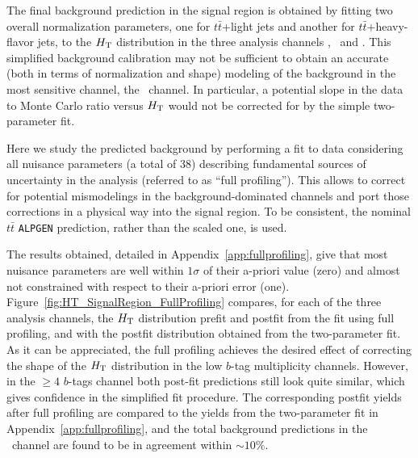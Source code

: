 
The final background 
prediction in the signal region is obtained by fitting two overall
normalization parameters, one for $t\bar{t}$+light jets 
and another for $t\bar{t}$+heavy-flavor jets, to the $\HT$ distribution in the
three analysis channels \chii, \chiii\ and \chiv. 
This simplified background 
calibration may not be sufficient to obtain an accurate 
(both in terms of normalization and shape) 
modeling of the background in the most sensitive channel, the
\chiv\ channel.
In particular, a potential slope in the data to Monte Carlo 
ratio versus $\HT$ would not be corrected for by the 
simple two-parameter fit.

Here we study the predicted background by performing 
a fit to data considering all nuisance parameters 
(a total of 38) describing fundamental
sources of uncertainty in the analysis (referred to as 
``full profiling''). This allows 
to correct for potential mismodelings in the 
background-dominated channels
and port those corrections in a physical way 
into the signal region. 
To be consistent, the nominal $t\bar{t}$ \texttt{ALPGEN} 
prediction, rather than the scaled one, is used.

The results obtained, detailed in Appendix~\ref{app:fullprofiling},
give that most nuisance parameters are well within
$1\sigma$ of their a-priori value (zero) and almost 
not constrained with respect to their a-priori error (one). 
Figure~\ref{fig:HT_SignalRegion_FullProfiling} compares, 
for each of the three analysis channels, the $\HT$ distribution 
prefit and postfit from the fit using full profiling, and with 
the postfit distribution
obtained from the two-parameter fit. As it can be appreciated, 
the full profiling achieves the desired effect of correcting 
the shape of the $\HT$ 
distribution in the low $b$-tag multiplicity channels. However, 
in the $\geq 4$ $b$-tags channel both post-fit predictions still look quite similar,
which gives confidence in the simplified fit procedure.
The corresponding postfit yields after full profiling are 
compared to the yields from the two-parameter fit in
 Appendix~\ref{app:fullprofiling}, and the total background predictions 
in the \chiv\ channel are found to be in agreement within $\sim 10\%$.

